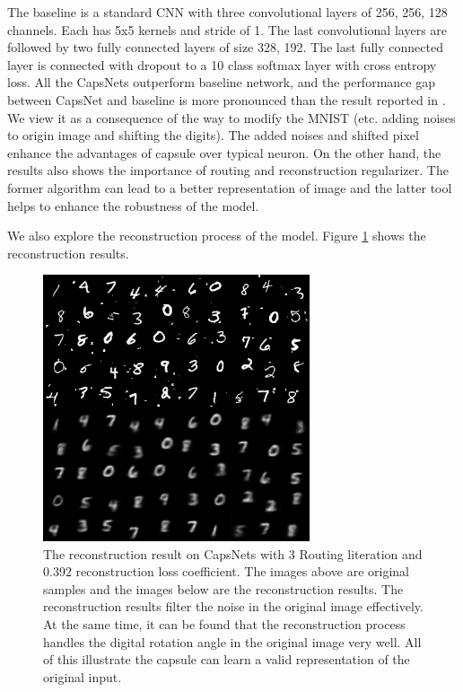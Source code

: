 \documentclass{article} %
\begin{document}
The baseline is a standard CNN with three convolutional layers of 256, 256, 128 channels. Each has 5x5 kernels and stride of 1. The last convolutional layers are followed by two fully connected layers of size 328, 192. The last fully connected layer is connected with dropout to a 10 class softmax layer with cross entropy loss. All the CapsNets outperform baseline network,  and the performance gap between CapsNet and baseline is more pronounced than the result reported in \cite{capsnet}. We view it as a consequence of the way to modify the MNIST (etc. adding noises to origin image and shifting the digits). The added noises and shifted pixel enhance the advantages of capsule over typical neuron. On the other hand, the results also shows the importance of routing and reconstruction regularizer. The former algorithm can lead to a better representation of image and the latter tool helps to enhance the robustness of the model. 

We also explore the reconstruction process of the model. Figure \ref{fig:reconstruction} shows the reconstruction results.
\begin{figure}[h]
	\centering
	\includegraphics[width=0.7\textwidth]{figs/reconstruction.png}
	\caption{The reconstruction result on CapsNets with 3 Routing literation and 0.392 reconstruction loss coefficient. The images above are original samples and the images below are the reconstruction results. The reconstruction results filter the noise in the original image effectively. At the same time, it can be found that the reconstruction process handles the digital rotation angle in the original image very well. All of this illustrate the capsule can learn a valid representation of the original input.}
	\label{fig:reconstruction}
\end{figure}
\end{document}
